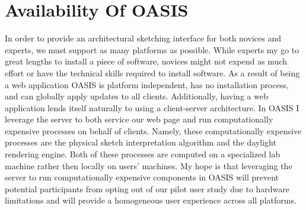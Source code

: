 \section{Availability Of OASIS}
In order to provide an architectural sketching interface for both novices and experts,  we must support as many platforms as possible. While experts my go to great lengths to install a piece of software, novices might not expend as much effort or have the technical skills required to install software.  As a result of being a web application OASIS is platform independent, has no installation process, and can globally apply updates to all clients.  Additionally, having a web application lends itself naturally to using a client-server architecture.  In OASIS I leverage the server to both service our web page and run computationally expensive processes on behalf of clients.  Namely, these computationally expensive processes are the physical sketch interpretation algorithm and the daylight rendering engine.  Both of these processes are computed on a specialized lab machine rather then locally on users' machines.  My hope is that leveraging the server to run computationally expensive components in OASIS will prevent potential participants from opting out of our pilot user study due to hardware limitations and will provide a homogeneous user experience across all platforms.  \\


